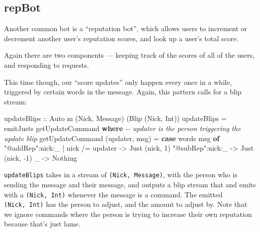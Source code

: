 \documentclass[]{article}
\newenvironment{Shaded}{}{}
\newcommand{\CommentTok}[1]{\textcolor[rgb]{0.38,0.63,0.69}{\textit{#1}}}
\newcommand{\DataTypeTok}[1]{\textcolor[rgb]{0.56,0.13,0.00}{#1}}
\newcommand{\DecValTok}[1]{\textcolor[rgb]{0.25,0.63,0.44}{#1}}
\newcommand{\FunctionTok}[1]{\textcolor[rgb]{0.02,0.16,0.49}{#1}}
\newcommand{\KeywordTok}[1]{\textcolor[rgb]{0.00,0.44,0.13}{\textbf{#1}}}
\newcommand{\NormalTok}[1]{#1}
\newcommand{\OperatorTok}[1]{\textcolor[rgb]{0.40,0.40,0.40}{#1}}
\newcommand{\OtherTok}[1]{\textcolor[rgb]{0.00,0.44,0.13}{#1}}
\newcommand{\StringTok}[1]{\textcolor[rgb]{0.25,0.44,0.63}{#1}}
\begin{document}
\hypertarget{repbot}{%
\subsection{repBot}\label{repbot}}

Another common bot is a ``reputation bot'', which allows users to increment or
decrement another user's reputation scores, and look up a user's total score.

Again there are two components --- keeping track of the scores of all of the
users, and responding to requests.

This time though, our ``score updates'' only happen every once in a while,
triggered by certain words in the message. Again, this pattern calls for a blip
stream:

\begin{Shaded}
\begin{Highlighting}[]
\OtherTok{updateBlips ::} \DataTypeTok{Auto}\NormalTok{ m (}\DataTypeTok{Nick}\NormalTok{, }\DataTypeTok{Message}\NormalTok{) (}\DataTypeTok{Blip}\NormalTok{ (}\DataTypeTok{Nick}\NormalTok{, }\DataTypeTok{Int}\NormalTok{))}
\NormalTok{updateBlips }\OtherTok{=}\NormalTok{ emitJusts getUpdateCommand}
  \KeywordTok{where}
    \CommentTok{{-}{-} updater is the person triggering the update blip}
\NormalTok{    getUpdateCommand (updater, msg) }\OtherTok{=}
      \KeywordTok{case} \FunctionTok{words}\NormalTok{ msg }\KeywordTok{of}
        \StringTok{"@addRep"}\OperatorTok{:}\NormalTok{nick}\OperatorTok{:}\NormalTok{\_ }\OperatorTok{|}\NormalTok{ nick }\OperatorTok{/=}\NormalTok{ updater }\OtherTok{{-}>} \DataTypeTok{Just}\NormalTok{ (nick, }\DecValTok{1}\NormalTok{)}
        \StringTok{"@subRep"}\OperatorTok{:}\NormalTok{nick}\OperatorTok{:}\NormalTok{\_                   }\OtherTok{{-}>} \DataTypeTok{Just}\NormalTok{ (nick, }\OperatorTok{{-}}\DecValTok{1}\NormalTok{)}
\NormalTok{        \_                                  }\OtherTok{{-}>} \DataTypeTok{Nothing}
\end{Highlighting}
\end{Shaded}

\texttt{updateBlips} takes in a stream of \texttt{(Nick,\ Message)}, with the
person who is sending the message and their message, and outputs a blip stream
that and emits with a \texttt{(Nick,\ Int)} whenever the message is a command.
The emitted \texttt{(Nick,\ Int)} has the person to adjust, and the amount to
adjust by. Note that we ignore commands where the person is trying to increase
their own reputation because that's just lame.
\end{document}
